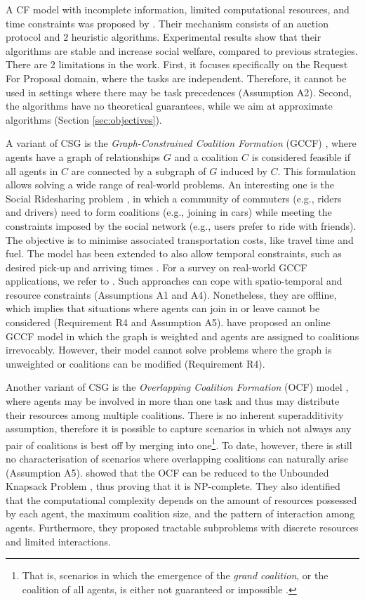 A CF model with incomplete information, limited computational resources, and time
constraints was proposed by \cite{kraus2003,kraus2004}. Their mechanism consists of an
auction protocol and $2$ heuristic algorithms. Experimental results show that their
algorithms are stable and increase social welfare, compared to previous strategies. There
are $2$ limitations in the work. First, it focuses specifically on the Request For
Proposal domain, where the tasks are independent. Therefore, it cannot be
used in settings where there may be task precedences (Assumption A2). Second, the
algorithms have no theoretical guarantees, while we aim at approximate algorithms (Section
\ref{sec:objectives}).

A variant of CSG is the \emph{Graph-Constrained Coalition Formation} (GCCF)
\cite{myerson1977}, where agents have a graph of relationships $G$ and a coalition $C$ is
considered feasible if all agents in $C$ are connected by a subgraph of $G$ induced by
$C$. This formulation allows solving a wide range of real-world problems. An interesting
one is the Social Ridesharing problem \cite{bistaffa2015}, in which a community of
commuters (e.g., riders and drivers) need to form coalitions (e.g., joining in cars) while
meeting the constraints imposed by the social network (e.g., users prefer to ride with
friends). The objective is to minimise associated transportation costs, like travel time
and fuel. The model has been extended to also allow temporal constraints, such as desired
pick-up and arriving times \cite{bistaffa2017a}. For a survey on real-world GCCF
applications, we refer to \cite{bistaffa2017b}. Such approaches can cope with
spatio-temporal and resource constraints (Assumptions A1 and A4). Nonetheless, they are
offline, which implies that situations where agents can join in or leave cannot be
considered (Requirement R4 and Assumption A5). \cite{flammini2018} have proposed an online
GCCF model in which the graph is weighted and agents are assigned to coalitions
irrevocably. However, their model cannot solve problems where the graph is unweighted or
coalitions can be modified (Requirement R4).

Another variant of CSG is the \emph{Overlapping Coalition Formation} (OCF) model
\cite{chalkiadakis2010}, where agents may be involved in more than one task and thus may
distribute their resources among multiple coalitions. There is no inherent superadditivity
assumption, therefore it is possible to capture scenarios in which not always any pair of
coalitions is best off by merging into one\footnote{That is, scenarios in which the
emergence of the \emph{grand coalition}, or the coalition of all agents, is either not
guaranteed or impossible \cite{sandholm1997,sandholm1999}.}. To date, however, there
is still no characterisation of scenarios where overlapping coalitions can naturally
arise (Assumption A5). \cite{zick2012} showed that the OCF can be reduced to the
Unbounded Knapsack Problem \cite{martello1990}, thus proving that it is NP-complete.
They also identified that the computational complexity depends on the amount of
resources possessed by each agent, the maximum coalition size, and the pattern of
interaction among agents. Furthermore, they proposed tractable subproblems with
discrete resources and limited interactions.

